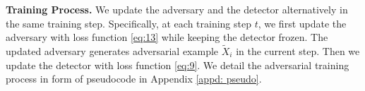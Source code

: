 \noindent\textbf{Training Process.}
We update the adversary and the detector alternatively in the same training step.
Specifically, at each training step $t$, we first update the adversary with loss function \eqref{eq:13} while keeping the detector frozen.
The updated adversary generates adversarial example $\tilde{X}_i$ in the current step.
Then we update the detector with loss function \eqref{eq:9}.
We detail the adversarial training process in form of pseudocode in Appendix \ref{appd: pseudo}.



\label{Adversarial Training}
